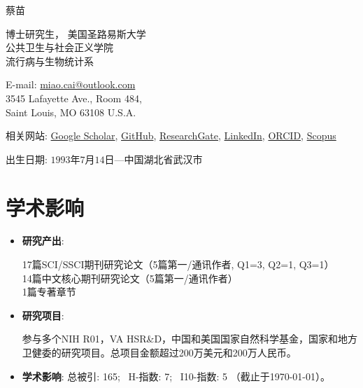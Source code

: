 \documentclass[11pt, a4paper]{article}
\newcommand{\fzxbs}{\CJKfamily{MyCJKfzxbs}}
\begin{document}
	{\LARGE {\fzxbs 蔡苗}}\vspace{0.3cm}
	
	\begin{minipage}[b]{0.65\linewidth}
		博士研究生， 美国圣路易斯大学\\
		公共卫生与社会正义学院\\
		流行病与生物统计系
	\end{minipage}
	\hfill
	\begin{minipage}[b]{0.35\linewidth}
		E-mail: \href{mailto:miao.cai@outlook.com}{miao.cai@outlook.com}\\
		3545 Lafayette Ave., Room 484, \\
		Saint Louis, MO 63108 U.S.A.
	\end{minipage}
	
	相关网站: 
	\href{https://scholar.google.com/citations?user=kjFCzEkAAAAJ&hl=en}{Google Scholar},
	\href{https://github.com/caimiao0714}{GitHub},
	\href{https://www.researchgate.net/profile/Miao_Cai2}{ResearchGate},
	\href{https://www.linkedin.com/in/miao-cai-7b5a62a3/}{LinkedIn},
	\href{https://orcid.org/0000-0003-0170-6905}{ORCID}, 
	\href{https://www.scopus.com/authid/detail.uri?authorId=56824998300}{Scopus}
	
	出生日期: $1993$年$7$月$14$日---中国湖北省武汉市
	
	\section*{学术影响}
	\begin{itemize}[leftmargin=0ex,itemsep=0ex]
		\item \textbf{研究产出}: 
		\begin{minipage}[t]{0.9\linewidth}
			17篇SCI/SSCI期刊研究论文（5篇第一/通讯作者, Q1=3, Q2=1, Q3=1）\\
			14篇中文核心期刊研究论文（5篇第一/通讯作者）\\
			1篇专著章节
		\end{minipage}
		
		\item \textbf{研究项目}: 
		\begin{minipage}[t]{0.9\linewidth}
			参与多个NIH R01，VA HSR\&D，中国和美国国家自然科学基金，国家和地方卫健委的研究项目。总项目金额超过200万美元和200万人民币。
		\end{minipage}

		
		\item \textbf{学术影响}: 总被引: 165; $\,$ H-指数: 7; $\,$ I10-指数: 5 （截止于\today）。
	\end{itemize}
	
\end{document}

